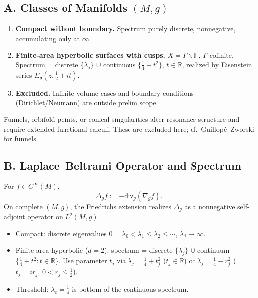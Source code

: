 \subsection*{A. Classes of Manifolds $(M,g)$}
\label{subsec:classes-sharp}

\begin{definition}
\begin{enumerate}[label=(\roman*)]
  \item \textbf{Compact without boundary.} Spectrum purely discrete, nonnegative, accumulating only at $\infty$.
  \item \textbf{Finite-area hyperbolic surfaces with cusps.} $X=\Gamma\backslash\mathbb H$, $\Gamma$ cofinite. Spectrum = discrete $\{\lambda_j\}$ $\cup$ continuous $\{\tfrac14+t^2\}$, $t\in\mathbb R$, realized by Eisenstein series $E_{\mathfrak a}(z,\tfrac12+it)$.
  \item \textbf{Excluded.} Infinite-volume cases and boundary conditions (Dirichlet/Neumann) are outside prelim scope.
\end{enumerate}
\end{definition}

\begin{remark}
Funnels, orbifold points, or conical singularities alter resonance structure and require extended functional calculi. These are excluded here; cf.\ Guillopé--Zworski for funnels.
\end{remark}


\subsection*{B. Laplace–Beltrami Operator and Spectrum}
\label{subsec:laplacian-sharp}

\begin{definition}
For $f\in C^\infty(M)$,
\[
  \Delta_g f := -\mathrm{div}_g(\nabla_g f).
\]
On complete $(M,g)$, the Friedrichs extension realizes $\Delta_g$ as a nonnegative self-adjoint operator on $L^2(M,g)$.
\end{definition}

\begin{conditions}
\begin{itemize}
  \item Compact: discrete eigenvalues $0=\lambda_0<\lambda_1\le\lambda_2\le\cdots$, $\lambda_j\to\infty$.
  \item Finite-area hyperbolic ($d=2$): spectrum = discrete $\{\lambda_j\}$ $\cup$ continuum $\{\tfrac14+t^2:t\in\mathbb R\}$. Use parameter $t_j$ via $\lambda_j=\tfrac14+t_j^2$ ($t_j\in\mathbb R$) or $\lambda_j=\tfrac14-r_j^2$ ($t_j=ir_j$, $0<r_j\le \tfrac12$).
  \item Threshold: $\lambda_c=\tfrac14$ is bottom of the continuous spectrum.
\end{itemize}
\end{conditions}

